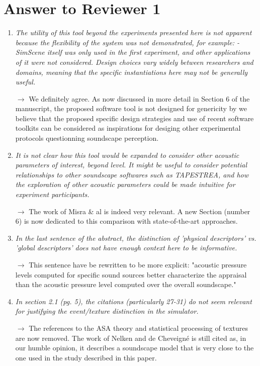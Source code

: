 \documentclass[10pt]{article}
\begin{document}
\section{Answer to Reviewer 1}

\begin{enumerate}

\item \emph{The utility of this tool beyond the experiments presented here is not apparent because the flexibility of the system was not demonstrated, for example:
- SimScene itself was only used in the first experiment, and other applications of it were not considered. Design choices vary widely between researchers and domains, meaning that the specific instantiations here may not be generally useful.}

$\rightarrow$ We definitely agree. As now discussed in more detail in Section 6 of the manuscript, the proposed software tool is not designed for genericity by we believe that the proposed specific design strategies and use of recent software toolkits can be considered as inspirations for desiging other experimental protocols questionning soundscape perception. 

\item \emph{It is not clear how this tool would be expanded to consider other acoustic parameters of interest, beyond level. It might be useful to consider potential relationships to other soundscape softwares such as TAPESTREA, and how the exploration of other acoustic parameters could be made intuitive for experiment participants.}

$\rightarrow$ The work of Misra \& al is indeed very relevant. A new Section (number 6) is now dedicated to this comparison with state-of-the-art approaches.

\item \emph{In the last sentence of the abstract, the distinction of 'physical descriptors' vs. 'global descriptors'  does not have enough context here to be informative.}

$\rightarrow$ This sentence have be rewritten to be more explicit: "acoustic pressure levels computed for specific sound sources better characterize the appraisal than the acoustic pressure level computed over the overall soundscape."

\item \emph{In section 2.1 (pg. 5), the citations (particularly 27-31) do not seem relevant for justifying the event/texture distinction in the simulator.}

$\rightarrow$ The references to the ASA theory and statistical processing of textures are now removed. The work of Nelken and de Cheveigné is still cited as, in our humble opinion, it describes a soundscape model that is very close to the one used in the study described in this paper.

\end{enumerate}
\end{document}
